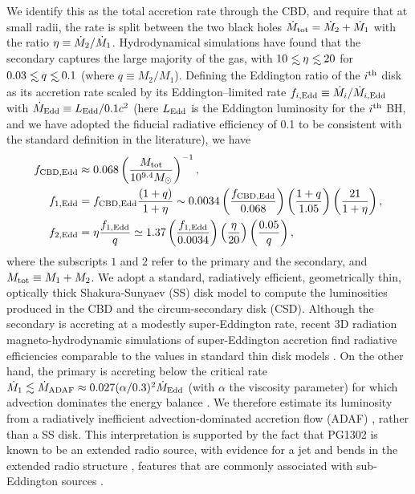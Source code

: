 We identify this as the total accretion rate through the CBD, and
require that at small radii, the rate is split between the two black
holes $\dot{M}_{\rm tot} = \dot{M}_2 + \dot{M}_1$ with the ratio $\eta\equiv
\dot{M}_2/\dot{M}_1$.  Hydrodynamical simulations \cite{Farris:2014} have
found that the secondary captures the large majority of the gas, with
$10\lsim \eta \lsim 20$ for $0.03\lsim q \lsim 0.1$ (where $q\equiv
M_2/M_1$).  Defining the Eddington ratio of the $i^{\rm{th}}$ disk as
its accretion rate scaled by its Eddington--limited rate
$f_{i,\rm{Edd}}\equiv \dot{M}_i/\dot{M}_{i,\rm{Edd}}$ with $\dot{M}_{\rm
  Edd} \equiv L_{\rm Edd}/0.1c^2$ (here $L_{\rm Edd}$ is the Eddington
luminosity for the $i^{\rm th}$ BH, and we have adopted the fiducial
radiative efficiency of 0.1 to be consistent with the standard
definition in the literature), we have
%
\begin{align}
f_{\rm{CBD,Edd}} & \approx   0.068 \left( \frac{M_{\rm tot}}{10^{9.4} \Msun} \right)^{-1}, \nonumber \\
%
f_{\rm{1,Edd}} &= f_{\rm{CBD,Edd}}  \frac{ \left( 1+q \right)}{1 + \eta}  \sim 0.0034 \left( \frac{ f_{\rm{CBD,Edd}}}{0.068} \right) \left(\frac{1+q}{1.05}\right) \left( \frac{21}{1+\eta}\right), \nonumber \\
%
f_{\rm{2,Edd}} &=\eta \frac{f_{\rm{1,Edd}}}{q} \simeq 1.37  \left( \frac{ f_{\rm{1,Edd}}}{0.0034} \right) \left( \frac{\eta}{20}\right) \left( \frac{0.05}{q}\right),
%
\label{Eq:TDfEdds}
\end{align}
%
where the subscripts $1$ and $2$ refer to the primary and the
secondary, and $M_{\rm tot} \equiv M_1 + M_2$.  We adopt a standard,
radiatively efficient, geometrically thin, optically thick
Shakura-Sunyaev (SS) disk model \cite{SS73} to compute the luminosities
produced in the CBD and the circum-secondary disk (CSD). Although the
secondary is accreting at a modestly super-Eddington rate, recent 3D
radiation magneto-hydrodynamic simulations of super-Eddington
accretion find radiative efficiencies comparable to the values in
standard thin disk models \cite{Jiang+2014}.  On the other hand, the
primary is accreting below the critical rate $\dot{M}_{\rm{1}}
\lesssim \dot{M}_{\rm{ADAF}} \approx 0.027 (\alpha/0.3)^2
\dot{M}_{\rm{Edd}}$ (with $\alpha$ the viscosity parameter) for which
advection dominates the energy balance \cite{NarayanMcClintock2008}. We
therefore estimate its luminosity from a radiatively inefficient
advection-dominated accretion flow (ADAF) \cite{Mahadevan:1997,
  NMQ:ADAF:1998}, rather than a SS disk.  This interpretation is
supported by the fact that PG1302 is known to be an extended radio
source, with evidence for a jet and bends in the extended radio
structure \cite{Hutchings+2014}, features that are commonly associated
with sub-Eddington sources \cite{WangHo:2003}.

